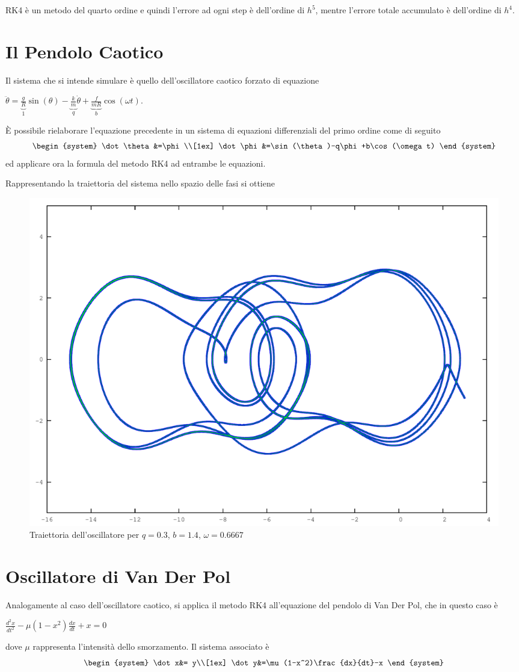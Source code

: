 RK4 è un metodo del quarto ordine e quindi l'errore ad ogni step è dell'ordine di $h^5$, mentre l'errore totale accumulato è dell'ordine di $h^4$.

\section{Il Pendolo Caotico}
Il sistema che si intende simulare è quello dell'oscillatore caotico forzato di equazione
\begin{center}
$\ddot{\theta} = \underbrace{\frac{g}{R}}_1 \sin(\theta)-\underbrace{\frac{k}{m}}_q \dot{\theta}+\underbrace{\frac{f}{mR}}_b \cos(\omega t)$.
\end{center}
È possibile rielaborare l'equazione precedente in un sistema di equazioni differenziali del primo ordine come di seguito
$$\begin{system}
\dot\theta&=\phi \\[1ex] \dot\phi&=\sin(\theta)-q\phi+b\cos(\omega t)
\end{system}$$
ed applicare ora la formula del metodo RK4 ad entrambe le equazioni.

Rappresentando la traiettoria del sistema nello spazio delle fasi si ottiene
\begin{figure}[h!]
\centering
\includegraphics[width=\textwidth]{chaotic}
\caption{Traiettoria dell'oscillatore per $q = 0.3$, $b = 1.4$, $\omega = 0.6667$}
\label{fig:chaotic}
\end{figure}

\section{Oscillatore di Van Der Pol}
Analogamente al caso dell'oscillatore caotico, si applica il metodo RK4 all'equazione del pendolo di Van Der Pol, che in questo caso è
\begin{center}
$\frac{d^2x}{dt^2}-\mu(1-x^2)\frac{dx}{dt}+x= 0$
\end{center}
dove $\mu$ rappresenta l'intensità dello smorzamento. Il sistema associato è
$$\begin{system}
\dot x&= y\\[1ex] \dot y&=\mu(1-x^2)\frac{dx}{dt}-x
\end{system}$$

